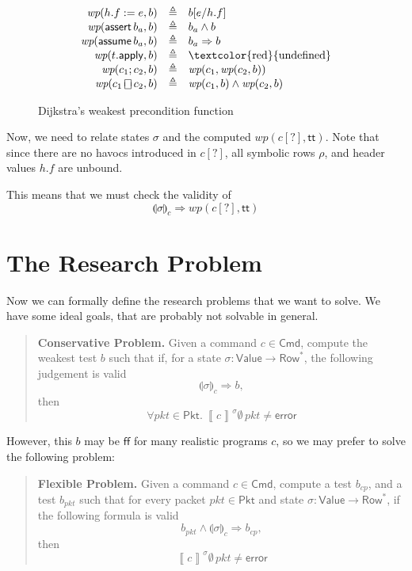 \documentclass{article}
\newcommand{\pkt}{\mathit{pkt}}
\newcommand{\error}{\mathsf{error}}
\newcommand{\denote}[1]{\left\llbracket#1\right\rrbracket}
\newcommand{\TRUE}{\mathsf{tt}}
\newcommand{\FALSE}{\mathsf{ff}}
\newcommand{\Value}{\mathsf{Value}}
\newcommand{\Cmd}{\mathsf{Cmd}}
\newcommand{\Pkt}{\mathsf{Pkt}}
\newcommand{\Row}{\mathsf{Row}}
\newcommand{\assert}{\mathop{\mathsf{assert}}}
\newcommand{\assume}{\mathop{\mathsf{assume}}}
\newcommand{\apply}{\mathsf{apply}}
\newcommand{\choiceop}{\rotatebox[origin=c]{90}{$\sqsubset\!\!\!\sqsupset$}}
\newcommand{\choice}{\mathbin{\choiceop}}
\newcommand{\havoc}[1]{\mathop{\textsf{havoc}}#1}
\newcommand{\WP}{\textit{wp}}
\newcommand{\state}[1]{\llparenthesis#1\rrparenthesis}
\newcommand{\instr}{[?]}
\begin{document}
\begin{figure}[H]
  \[
  \begin{array}{r >{\triangleq}c l}
    \WP(h.f := e, b)
    && b[e/h.f] \\
    \WP(\assert b_a, b)
    && b_a \wedge b \\
    \WP(\assume b_a, b)
    && b_a \Rightarrow b \\
    \WP(t.\apply,b) && \textrm{\textcolor{red}{undefined}} \\
    \WP(c_1;c_2, b)
    && \WP(c_1,\WP(c_2,b)) \\
    \WP(c_1 \choice c_2, b)
    && \WP(c_1,b) \wedge \WP(c_2,b)
  \end{array}
  \]
  \caption{Dijkstra's weakest precondition function}
  \label{fig:wp}
\end{figure}

Now, we need to relate states $\sigma$ and the computed $\WP(c\instr,\TRUE)$.
Note that since there are no havocs introduced in $c\instr$, all symbolic rows
$\rho$, and header values $h.f$ are unbound.

This means that we must check the validity of \[\state\sigma_c \Rightarrow
\WP(c\instr,\TRUE)\]



\clearpage
\section{The Research Problem}

Now we can formally define the research problems that we want to solve. We have
some ideal goals, that are probably not solvable in general.

\begin{quote}
  \textbf{Conservative Problem.} Given a command $c \in \Cmd$, compute the weakest test
  $b$ such that if, for a state $\sigma : \Value \to \Row^*$, the following
  judgement is valid \[\state\sigma_c \Rightarrow b,\] then \[\forall \pkt \in \Pkt.~
  \denote{c}^\sigma \emptyset\,\pkt \neq \error \]
\end{quote}

However, this $b$ may be $\FALSE$ for many realistic programs $c$, so we may
prefer to solve the following problem:

\begin{quote}
  \textbf{Flexible Problem.} Given a command $c \in \Cmd$, compute a test
  $b_{\mathit{cp}}$, and a test $b_{\mathit{pkt}}$ such that for every packet
  $\pkt \in \Pkt$ and state $\sigma : \Value \to \Row^*$, if the following
  formula is valid
  \[b_{\mathit{pkt}} \wedge \state\sigma_c \Rightarrow b_{\mathit{cp}},\]
  then \[\denote{c}^\sigma\emptyset\,\pkt \neq \error \]
\end{quote}
\end{document}
